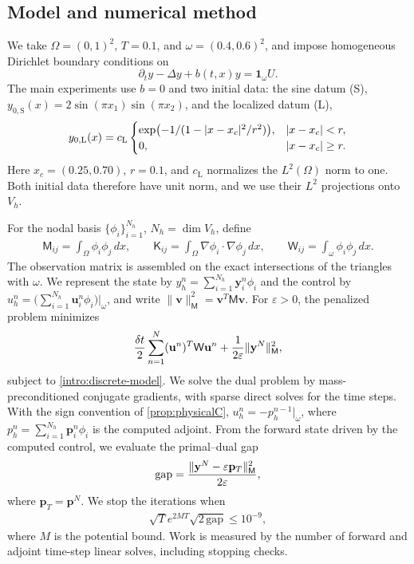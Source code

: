 \documentclass[print,wide,eng]{draft}
\begin{document}
\subsection{Model and numerical method}

We take $\Omega=(0,1)^2$, $T=0.1$, and $\omega=(0.4,0.6)^2$, and impose homogeneous Dirichlet boundary conditions on\vspace{-2mm}
%
$$
\partial_t y-\Delta y+b(t,x)y=\mathbf1_\omega U.
$$
%
The main experiments use $b=0$ and two initial data: the sine datum (S), $y_{0,\mathrm S}(x)=2\sin(\pi x_1)\sin(\pi x_2)$, and the localized datum (L),\vspace{-2mm}
%
$$
y_{0,\mathrm L}(x)=c_{\mathrm L}
\begin{cases}
\exp\bigl(-1/(1-|x-x_c|^2/r^2)\bigr),& |x-x_c|<r,\\
0,& |x-x_c|\geq r.
\end{cases}\vspace{-2mm}
$$
%
Here $x_c=(0.25,0.70)$, $r=0.1$, and $c_{\mathrm L}$ normalizes the $L^2(\Omega)$ norm to one. Both initial data therefore have unit norm, and we use their $L^2$ projections onto $V_h$.

For the nodal basis $\{\phi_i\}_{i=1}^{N_h}$, $N_h=\dim V_h$, define
%
\begin{align*}
\mathsf M_{ij}=\int_\Omega\phi_i\phi_j\,dx,\qquad
\mathsf K_{ij}=\int_\Omega\nabla\phi_i\cdot\nabla\phi_j\,dx,\qquad
\mathsf W_{ij}=\int_\omega\phi_i\phi_j\,dx.
\end{align*}
%
The observation matrix is assembled on the exact intersections of the triangles with $\omega$. We represent the state by $y_h^n=\sum\limits_{i=1}^{N_h}\mathbf y_i^n\phi_i$ and the control by $u_h^n=\big(\sum\limits_{i=1}^{N_h}\mathbf u_i^n\phi_i\big)\big|_\omega$, and write $\|\mathbf v\|_{\mathsf M}^2=\mathbf v^T\mathsf M\mathbf v$. For $\varepsilon>0$, the penalized problem minimizes\vspace{-2mm}
%
$$
\frac{\delta t}{2}\sum_{n=1}^N(\mathbf u^n)^T\mathsf W\mathbf u^n
+\frac{1}{2\varepsilon}\|\mathbf y^N\|_{\mathsf M}^2,\vspace{-2mm}
$$
%
subject to \cref{intro:discrete-model}. We solve the dual problem by mass-preconditioned conjugate gradients, with sparse direct solves for the time steps. With the sign convention of \cref{prop:physicalC}, $u_h^n=-p_h^{n-1}|_\omega$, where $p_h^n=\sum\limits_{i=1}^{N_h}\mathbf p_i^n\phi_i$ is the computed adjoint. From the forward state driven by the computed control, we evaluate the primal--dual gap\vspace{-2mm}
%
$$
\mathrm{gap}=\frac{\|\mathbf y^N-\varepsilon\mathbf p_T\|_{\mathsf M}^2}{2\varepsilon},\vspace{-2mm}
$$
%
where $\mathbf p_T=\mathbf p^N$. We stop the iterations when\vspace{-2mm}
%
\begin{align}\label{eq:num-gap}
\sqrt T e^{2MT}\sqrt{2\,\mathrm{gap}}\leq10^{-9},
\end{align}
%
where $M$ is the potential bound. Work is measured by the number of forward and adjoint time-step linear solves, including stopping checks.
\end{document}

